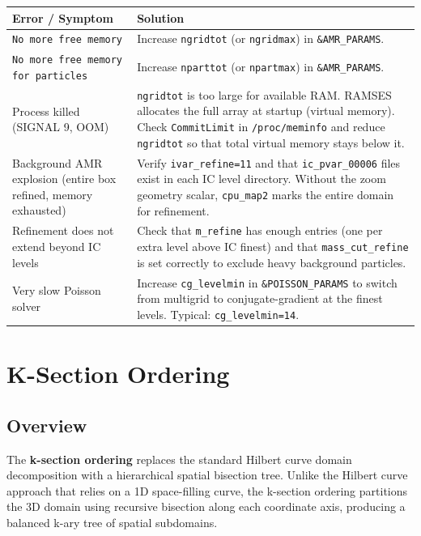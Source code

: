 \documentclass[11pt,fleqn]{book}
\begin{document}
\begin{center}
\begin{longtable}{L{4.5cm} L{8.5cm}}
\toprule
\textbf{Error / Symptom} & \textbf{Solution} \\
\midrule
\endhead
\texttt{No more free memory} & Increase \texttt{ngridtot} (or \texttt{ngridmax}) in \texttt{\&AMR\_PARAMS}. \\
\midrule
\texttt{No more free memory for particles} & Increase \texttt{nparttot} (or \texttt{npartmax}) in \texttt{\&AMR\_PARAMS}. \\
\midrule
Process killed (SIGNAL 9, OOM) & \texttt{ngridtot} is too large for available RAM. RAMSES allocates the full array at startup (virtual memory). Check \texttt{CommitLimit} in \texttt{/proc/meminfo} and reduce \texttt{ngridtot} so that total virtual memory stays below it. \\
\midrule
Background AMR explosion (entire box refined, memory exhausted) & Verify \texttt{ivar\_refine=11} and that \texttt{ic\_pvar\_00006} files exist in each IC level directory. Without the zoom geometry scalar, \texttt{cpu\_map2} marks the entire domain for refinement. \\
\midrule
Refinement does not extend beyond IC levels & Check that \texttt{m\_refine} has enough entries (one per extra level above IC finest) and that \texttt{mass\_cut\_refine} is set correctly to exclude heavy background particles. \\
\midrule
Very slow Poisson solver & Increase \texttt{cg\_levelmin} in \texttt{\&POISSON\_PARAMS} to switch from multigrid to conjugate-gradient at the finest levels. Typical: \texttt{cg\_levelmin=14}. \\
\bottomrule
\end{longtable}
\end{center}


\chapter{K-Section Ordering}

\section{Overview}

The \textbf{k-section ordering} replaces the standard Hilbert curve domain decomposition with a hierarchical spatial bisection tree. Unlike the Hilbert curve approach that relies on a 1D space-filling curve, the k-section ordering partitions the 3D domain using recursive bisection along each coordinate axis, producing a balanced k-ary tree of spatial subdomains.
\end{document}

